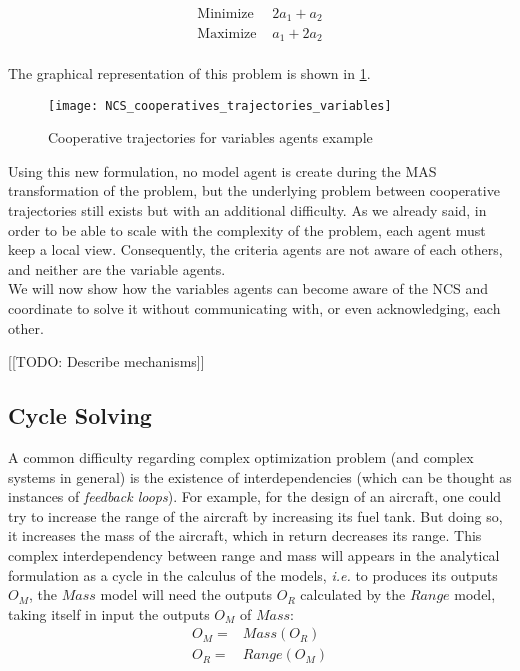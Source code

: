 \begin{align*}
\text{Minimize } &2a_1 + a_2\\
\text{Maximize } &a_1 + 2a_2\\
\end{align*}

The graphical representation of this problem is shown in \figurename{} \ref{NCS_cooperatives_trajectories_variables}.

\begin{figure}
\centering
\texttt{[image: NCS\_cooperatives\_trajectories\_variables]}
\caption{Cooperative trajectories for variables agents example}\label{NCS_cooperatives_trajectories_variables}
\end{figure}

Using this new formulation, no model agent is create during the MAS transformation of the problem, but the underlying problem between cooperative trajectories still exists but with an additional difficulty. As we already said, in order to be able to scale with the complexity of the problem, each agent must keep a local view. Consequently, the criteria agents are not aware of each others, and neither are the variable agents.\\
We will now show how the variables agents can become aware of the NCS and coordinate to solve it without communicating with, or even acknowledging, each other.

[[TODO: Describe mechanisms]]

\subsection{Cycle Solving}\label{NCS_cycles}

A common difficulty regarding complex optimization problem (and complex systems in general) is the existence of interdependencies (which can be thought as instances of \emph{feedback loops}). For example, for the design of an aircraft, one could try to increase the range of the aircraft by increasing its fuel tank. But doing so, it increases the mass of the aircraft, which in return decreases its range. This complex interdependency between range and mass will appears in the analytical formulation as a cycle in the calculus of the models, \emph{i.e.} to produces its outputs $O_M$, the $Mass$ model will need the outputs $O_R$ calculated by the $Range$ model, taking itself in input the outputs $O_M$ of $Mass$:
\begin{align*}
O_M = &Mass(O_R)\\
O_R = &Range(O_M)
\end{align*}

